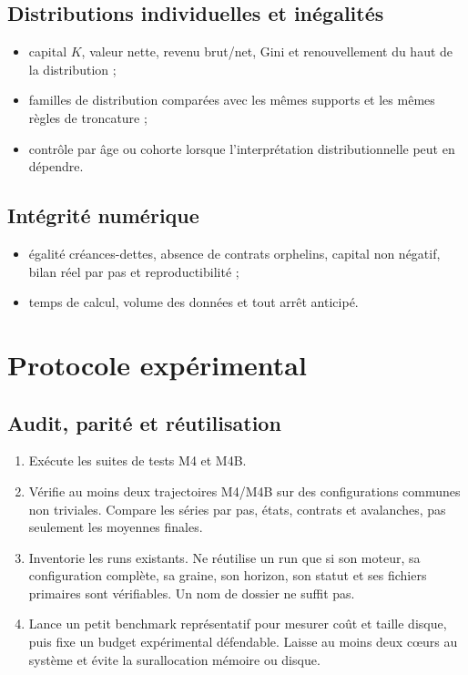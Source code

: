 \documentclass[11pt,a4paper]{article}
\begin{document}
\subsection{Distributions individuelles et inégalités}

\begin{itemize}
  \item capital $K$, valeur nette, revenu brut/net, Gini et renouvellement du
    haut de la distribution ;
  \item familles de distribution comparées avec les mêmes supports et les
    mêmes règles de troncature ;
  \item contrôle par âge ou cohorte lorsque l'interprétation distributionnelle
    peut en dépendre.
\end{itemize}

\subsection{Intégrité numérique}

\begin{itemize}
  \item égalité créances-dettes, absence de contrats orphelins, capital non
    négatif, bilan réel par pas et reproductibilité ;
  \item temps de calcul, volume des données et tout arrêt anticipé.
\end{itemize}

\section{Protocole expérimental}

\subsection{Audit, parité et réutilisation}

\begin{enumerate}
  \item Exécute les suites de tests M4 et M4B.
  \item Vérifie au moins deux trajectoires M4/M4B sur des configurations
    communes non triviales. Compare les séries par pas, états, contrats et
    avalanches, pas seulement les moyennes finales.
  \item Inventorie les runs existants. Ne réutilise un run que si son moteur,
    sa configuration complète, sa graine, son horizon, son statut et ses
    fichiers primaires sont vérifiables. Un nom de dossier ne suffit pas.
  \item Lance un petit benchmark représentatif pour mesurer coût et taille
    disque, puis fixe un budget expérimental défendable. Laisse au moins deux
    cœurs au système et évite la surallocation mémoire ou disque.
\end{enumerate}
\end{document}
